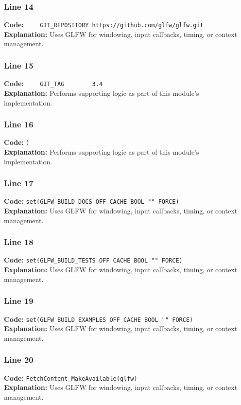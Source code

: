 \documentclass[11pt,a4paper]{article}
\begin{document}
\subsubsection*{Line 14}
\textbf{Code:} \verb|    GIT_REPOSITORY https://github.com/glfw/glfw.git|\\
\textbf{Explanation:} Uses GLFW for windowing, input callbacks, timing, or context management.

\subsubsection*{Line 15}
\textbf{Code:} \verb|    GIT_TAG        3.4|\\
\textbf{Explanation:} Performs supporting logic as part of this module's implementation.

\subsubsection*{Line 16}
\textbf{Code:} \verb|)|\\
\textbf{Explanation:} Performs supporting logic as part of this module's implementation.

\subsubsection*{Line 17}
\textbf{Code:} \verb|set(GLFW_BUILD_DOCS OFF CACHE BOOL "" FORCE)|\\
\textbf{Explanation:} Uses GLFW for windowing, input callbacks, timing, or context management.

\subsubsection*{Line 18}
\textbf{Code:} \verb|set(GLFW_BUILD_TESTS OFF CACHE BOOL "" FORCE)|\\
\textbf{Explanation:} Uses GLFW for windowing, input callbacks, timing, or context management.

\subsubsection*{Line 19}
\textbf{Code:} \verb|set(GLFW_BUILD_EXAMPLES OFF CACHE BOOL "" FORCE)|\\
\textbf{Explanation:} Uses GLFW for windowing, input callbacks, timing, or context management.

\subsubsection*{Line 20}
\textbf{Code:} \verb|FetchContent_MakeAvailable(glfw)|\\
\textbf{Explanation:} Uses GLFW for windowing, input callbacks, timing, or context management.
\end{document}
